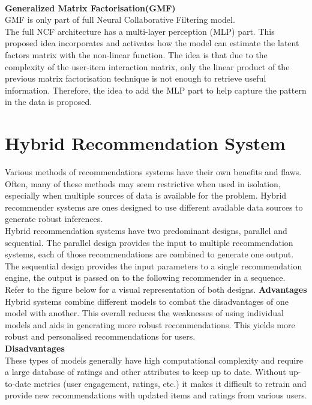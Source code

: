 \\\textbf{Generalized Matrix Factorisation(GMF)}
 \\GMF is only part of full Neural Collaborative Filtering model.
 \\The full NCF architecture has a multi-layer perception (MLP) part. This proposed idea incorporates and activates how the model can estimate the latent factors matrix with the non-linear function. The idea is that due to the complexity of the user-item interaction matrix, only the linear product of the previous matrix factorisation technique is not enough to retrieve useful information. Therefore, the idea to add the MLP part to help capture the pattern in the data is proposed.

\section{Hybrid Recommendation System}
Various methods of recommendations systems have their own benefits and flaws. Often, many of these methods may seem restrictive when used in isolation, especially when multiple sources of data is available for the problem. Hybrid recommender systems are ones designed to use different available data sources to generate robust inferences.
\\Hybrid recommendation systems have two predominant designs, parallel and sequential. The parallel design provides the input to multiple recommendation systems, each of those recommendations are combined to generate one output. 
The sequential design provides the input parameters to a single recommendation engine, the output is passed on to the following recommender in a sequence. Refer to the figure below for a visual representation of both designs.
\textbf{Advantages}
\\Hybrid systems combine different models to combat the disadvantages of one model with another. This overall reduces the weaknesses of using individual models and aids in generating more robust recommendations. This yields more robust and personalised recommendations for users.
\\\textbf{Disadvantages}
\\These types of models generally have high computational complexity and require a large database of ratings and other attributes to keep up to date. 
Without up-to-date metrics (user engagement, ratings, etc.) it makes it difficult to retrain and provide new recommendations with updated items and ratings from various users.


